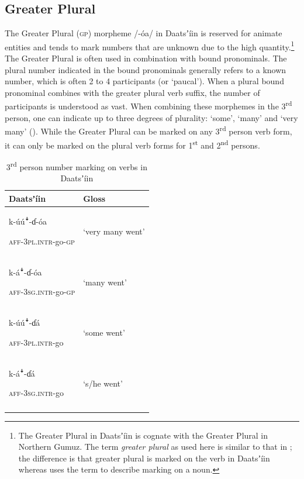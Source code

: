\documentclass[output=paper]{langsci/langscibook}
\begin{document}
\subsection{Greater Plural}\label{sec:ahlandc:4.3}

The Greater Plural (\textsc{gp}) morpheme /-\'{o}a/ in Daatsʼíin is reserved for animate entities and tends to mark numbers that are unknown due to the high quantity.\footnote{The Greater Plural in Daatsʼíin is cognate with the Greater Plural in Northern Gumuz. The term \textit{greater plural} as used here is similar to that in \citet{Corbett2000}; the difference is that greater plural is marked on the verb in Daatsʼíin whereas \citet{Corbett2000} uses the term to describe marking on a noun.} The Greater Plural is often used in combination with bound pronominals. The plural number indicated in the bound pronominals generally refers to a known number, which is often 2 to 4 participants (or ‘paucal’).  When a plural bound pronominal combines with the greater plural verb suffix, the number of participants is understood as vast. When combining these morphemes in the 3\textsuperscript{rd} person, one can indicate up to three degrees of plurality: ‘some’, ‘many’ and ‘very many’ (). While the Greater Plural can be marked on any 3\textsuperscript{rd} person verb form, it can only be marked on the plural verb forms for 1\textsuperscript{st} and 2\textsuperscript{nd} persons.

\begin{table}

\begin{tabularx}{\textwidth}{XX}
\lsptoprule
Daatsʼíin & Gloss\\
\midrule
{k-\'{u}\'{u}\textsf{ꜜ}-ɗ{}-\'{o}a}

\textsc{aff-3pl.intr}{}-go-\textsc{gp} & ‘very many went’\\
{k-á\textsf{ꜜ}-ɗ{}-\'{o}a}

\textsc{aff-3sg.intr}{}-go-\textsc{gp} & ‘many went’\\
{k-\'{u}\'{u}\textsf{ꜜ}-ɗá}

\textsc{aff-3pl.intr}{}-go & ‘some went’\\
{k-á\textsf{ꜜ}-ɗá}

\textsc{aff-3sg.intr}{}-go & ‘s/he went’\\
\lspbottomrule
\end{tabularx}
\caption{3\textsuperscript{rd} person number marking on verbs in Daatsʼíin}
\label{tab:ahlandc:5}
\end{table}
\end{document}
